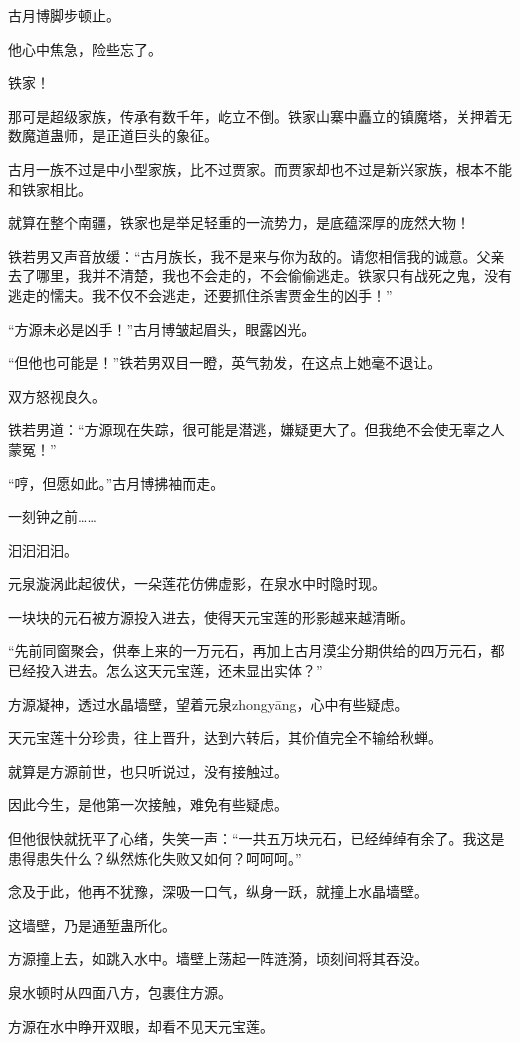 \begin{this_body}
古月博脚步顿止。

他心中焦急，险些忘了。

铁家！

那可是超级家族，传承有数千年，屹立不倒。铁家山寨中矗立的镇魔塔，关押着无数魔道蛊师，是正道巨头的象征。

古月一族不过是中小型家族，比不过贾家。而贾家却也不过是新兴家族，根本不能和铁家相比。

就算在整个南疆，铁家也是举足轻重的一流势力，是底蕴深厚的庞然大物！

铁若男又声音放缓：“古月族长，我不是来与你为敌的。请您相信我的诚意。父亲去了哪里，我并不清楚，我也不会走的，不会偷偷逃走。铁家只有战死之鬼，没有逃走的懦夫。我不仅不会逃走，还要抓住杀害贾金生的凶手！”

“方源未必是凶手！”古月博皱起眉头，眼露凶光。

“但他也可能是！”铁若男双目一瞪，英气勃发，在这点上她毫不退让。

双方怒视良久。

铁若男道：“方源现在失踪，很可能是潜逃，嫌疑更大了。但我绝不会使无辜之人蒙冤！”

“哼，但愿如此。”古月博拂袖而走。

一刻钟之前……

汩汩汩汩。

元泉漩涡此起彼伏，一朵莲花仿佛虚影，在泉水中时隐时现。

一块块的元石被方源投入进去，使得天元宝莲的形影越来越清晰。

“先前同窗聚会，供奉上来的一万元石，再加上古月漠尘分期供给的四万元石，都已经投入进去。怎么这天元宝莲，还未显出实体？”

方源凝神，透过水晶墙壁，望着元泉zhongyāng，心中有些疑虑。

天元宝莲十分珍贵，往上晋升，达到六转后，其价值完全不输给秋蝉。

就算是方源前世，也只听说过，没有接触过。

因此今生，是他第一次接触，难免有些疑虑。

但他很快就抚平了心绪，失笑一声：“一共五万块元石，已经绰绰有余了。我这是患得患失什么？纵然炼化失败又如何？呵呵呵。”

念及于此，他再不犹豫，深吸一口气，纵身一跃，就撞上水晶墙壁。

这墙壁，乃是通堑蛊所化。

方源撞上去，如跳入水中。墙壁上荡起一阵涟漪，顷刻间将其吞没。

泉水顿时从四面八方，包裹住方源。

方源在水中睁开双眼，却看不见天元宝莲。


\end{this_body}
